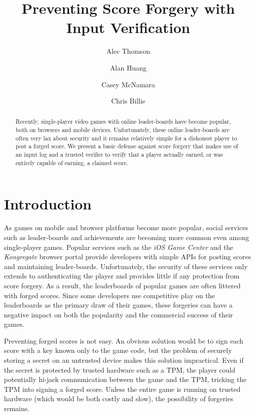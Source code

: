 \documentclass [11pt, twocolumn] {article}
\begin{document}
 

\title { Preventing Score Forgery with Input Verification } 
\author{ Alec Thomson \and Alan Huang \and Casey McNamara \and Chris Billie }
\date {}

\maketitle 

\begin{abstract}
Recently, single-player video games with online leader-boards have become popular, both on browsers and mobile devices. Unfortunately, these online leader-boards are often very lax about security and it remains relatively simple for a dishonest player to post a forged score. We present a basic defense against score forgery that makes use of an input log and a trusted verifier to verify that a player actually earned, or was entirely capable of earning, a claimed score. 
\end{abstract}

\section { Introduction }

As games on mobile and browser platforms become more popular, social services such as leader-boards and achievements are becoming more common even among single-player games. Popular services such as the \emph {iOS Game Center} and the \emph {Kongregate} browser portal provide developers with simple APIs for posting scores and maintaining leader-boards. Unfortunately, the security of these services only extends to authenticating the player and provides little if any protection from score forgery. As a result, the leaderboards of popular games are often littered with forged scores. Since some developers use competitive play on the leaderboards as the primary draw of their games, these forgeries can have a negative impact on both the popularity and the commercial success of their games.

Preventing forged scores is not easy. An obvious solution would be to sign each score with a key known only to the game code, but the problem of  securely storing a secret on an untrusted device makes this solution impractical. Even if the secret is protected by trusted hardware such as a TPM, the player could potentially hi-jack communication between the game and the TPM, tricking the TPM into signing a forged score. Unless the entire game is running on trusted hardware (which would be both costly and slow), the possibility of forgeries remains.
\end{document}
